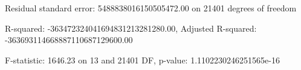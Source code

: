 Residual standard error: 5488838016150505472.00 on 21401 degrees of freedom

R-squared: -363472324041694831213281280.00, Adjusted R-squared: -363693114668887110687129600.00

F-statistic: 1646.23 on 13 and 21401 DF, p-value: 1.1102230246251565e-16

